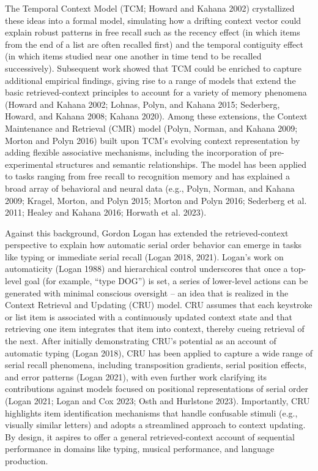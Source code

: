 \documentclass[
  letterpaper,
  DIV=11,
  numbers=noendperiod]{scrartcl}
\begin{document}
The Temporal Context Model (TCM; Howard and Kahana 2002) crystallized
these ideas into a formal model, simulating how a drifting context
vector could explain robust patterns in free recall such as the recency
effect (in which items from the end of a list are often recalled first)
and the temporal contiguity effect (in which items studied near one
another in time tend to be recalled successively). Subsequent work
showed that TCM could be enriched to capture additional empirical
findings, giving rise to a range of models that extend the basic
retrieved-context principles to account for a variety of memory
phenomena (Howard and Kahana 2002; Lohnas, Polyn, and Kahana 2015;
Sederberg, Howard, and Kahana 2008; Kahana 2020). Among these
extensions, the Context Maintenance and Retrieval (CMR) model (Polyn,
Norman, and Kahana 2009; Morton and Polyn 2016) built upon TCM's
evolving context representation by adding flexible associative
mechanisms, including the incorporation of pre-experimental structures
and semantic relationships. The model has been applied to tasks ranging
from free recall to recognition memory and has explained a broad array
of behavioral and neural data (e.g., Polyn, Norman, and Kahana 2009;
Kragel, Morton, and Polyn 2015; Morton and Polyn 2016; Sederberg et al.
2011; Healey and Kahana 2016; Horwath et al. 2023).

Against this background, Gordon Logan has extended the retrieved-context
perspective to explain how automatic serial order behavior can emerge in
tasks like typing or immediate serial recall (Logan 2018, 2021). Logan's
work on automaticity (Logan 1988) and hierarchical control underscores
that once a top-level goal (for example, ``type DOG'') is set, a series
of lower-level actions can be generated with minimal conscious oversight
-- an idea that is realized in the Context Retrieval and Updating (CRU)
model. CRU assumes that each keystroke or list item is associated with a
continuously updated context state and that retrieving one item
integrates that item into context, thereby cueing retrieval of the next.
After initially demonstrating CRU's potential as an account of automatic
typing (Logan 2018), CRU has been applied to capture a wide range of
serial recall phenomena, including transposition gradients, serial
position effects, and error patterns (Logan 2021), with even further
work clarifying its contributions against models focused on positional
representations of serial order (Logan 2021; Logan and Cox 2023; Osth
and Hurlstone 2023). Importantly, CRU highlights item identification
mechanisms that handle confusable stimuli (e.g., visually similar
letters) and adopts a streamlined approach to context updating. By
design, it aspires to offer a general retrieved-context account of
sequential performance in domains like typing, musical performance, and
language production.
\end{document}
